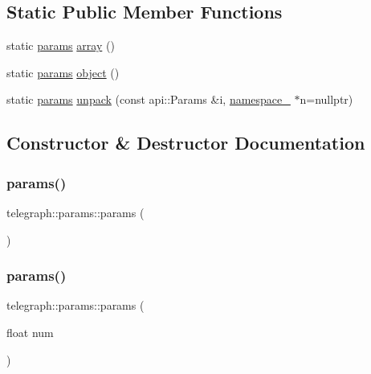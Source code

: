 \subsection*{Static Public Member Functions}
\begin{DoxyCompactItemize}
\item 
static \hyperlink{classtelegraph_1_1params}{params} \hyperlink{classtelegraph_1_1params_a349fa6f58000ece5ee504bd0d59b5f6e}{array} ()
\item 
static \hyperlink{classtelegraph_1_1params}{params} \hyperlink{classtelegraph_1_1params_a392011bc2e0723dbce6d3f7011576785}{object} ()
\item 
static \hyperlink{classtelegraph_1_1params}{params} \hyperlink{classtelegraph_1_1params_aef07126189dafa3aafd67fdee35caab8}{unpack} (const api\+::\+Params \&i, \hyperlink{classtelegraph_1_1namespace__}{namespace\+\_\+} $\ast$n=nullptr)
\end{DoxyCompactItemize}


\subsection{Constructor \& Destructor Documentation}
\mbox{\label{classtelegraph_1_1params_af67ec32e2151fd4dd8ec293df29b48d5}} 
\subsubsection{\texorpdfstring{params()}{params()}\hspace{0.1cm}{\footnotesize\ttfamily [1/17]}}
{\footnotesize\ttfamily telegraph\+::params\+::params (\begin{DoxyParamCaption}{ }\end{DoxyParamCaption})\hspace{0.3cm}{\ttfamily [inline]}}

\mbox{\label{classtelegraph_1_1params_ae2725f3f72d6a482bfea6260765ce399}} 
\subsubsection{\texorpdfstring{params()}{params()}\hspace{0.1cm}{\footnotesize\ttfamily [2/17]}}
{\footnotesize\ttfamily telegraph\+::params\+::params (\begin{DoxyParamCaption}\item[{float}]{num }\end{DoxyParamCaption})\hspace{0.3cm}{\ttfamily [inline]}}

